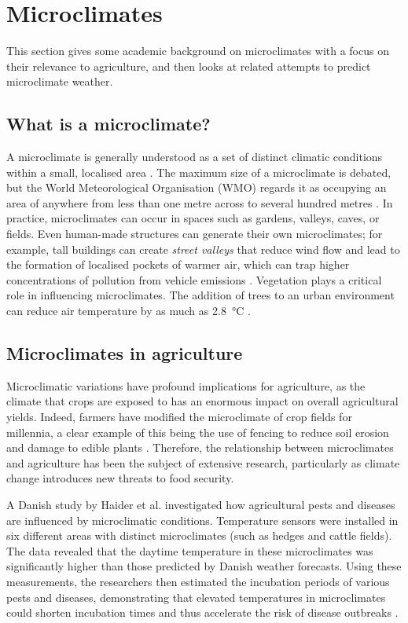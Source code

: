 \section{Microclimates}

This section gives some academic background on microclimates with a focus on
their relevance to agriculture, and then looks at related attempts to predict
microclimate weather.

\subsection{What is a microclimate?}

A microclimate is generally understood as a set of distinct climatic conditions
within a small, localised area \cite{MetOffice2023}. The maximum size of a
microclimate is debated, but the World Meteorological Organisation (WMO) regards
it as occupying an area of anywhere from less than one metre across to several
hundred metres \cite{wmo2024}.  In practice, microclimates can occur in spaces
such as gardens, valleys, caves, or fields. Even human-made structures can
generate their own microclimates; for example, tall buildings can create
\emph{street valleys} that reduce wind flow and lead to the formation of
localised pockets of warmer air, which  can trap higher concentrations of
pollution from vehicle emissions \cite{yang2023}. Vegetation plays a critical
role in influencing microclimates. The addition of trees to an urban environment
can reduce air temperature by as much as \SI{2.8}{\degreeCelsius}
\cite{lai2019}.

\subsection{Microclimates in agriculture}

Microclimatic variations have profound implications for agriculture, as the
climate that crops are exposed to has an enormous impact on overall agricultural
yields. Indeed, farmers have modified the microclimate of crop fields for
millennia, a clear example of this being the use of fencing to reduce soil
erosion and damage to edible plants \cite{cleugh1998}. Therefore, the
relationship between microclimates and agriculture has been the subject of
extensive research, particularly as climate change introduces new threats to
food security.

A Danish study by Haider et al. investigated how agricultural pests and diseases
are influenced by microclimatic conditions. Temperature sensors were installed
in six different areas with distinct microclimates (such as hedges and cattle
fields). The data revealed that the daytime temperature in these microclimates
was significantly higher than those predicted by Danish weather forecasts. Using
these measurements, the researchers then estimated the incubation periods of
various pests and diseases, demonstrating that elevated temperatures in
microclimates could shorten incubation times and thus accelerate the risk of
disease outbreaks \cite{haider2017}.

